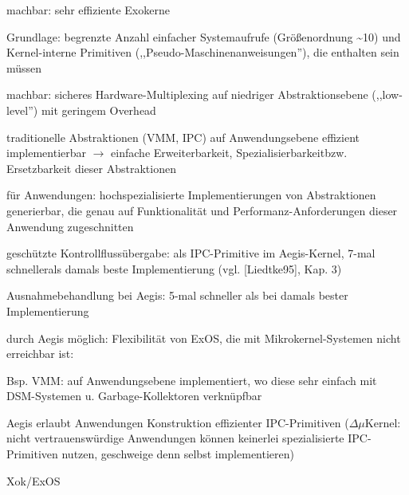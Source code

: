 \documentclass[a4paper]{article}
\begin{document}
\begin{multicols}{3}
    \begin{enumerate*}
        \item
        machbar: sehr effiziente Exokerne
        \begin{itemize*}
            \item Grundlage: begrenzte Anzahl einfacher Systemaufrufe (Größenordnung \textasciitilde10) und Kernel-interne Primitiven (,,Pseudo-Maschinenanweisungen''), die enthalten sein müssen
        \end{itemize*}
        \item
        machbar: sicheres Hardware-Multiplexing auf niedriger
        Abstraktionsebene (,,low-level'') mit geringem Overhead
        \item
        traditionelle Abstraktionen (VMM, IPC) auf Anwendungsebene effizient
        implementierbar $\rightarrow$  einfache
        Erweiterbarkeit, Spezialisierbarkeitbzw. Ersetzbarkeit dieser
        Abstraktionen
        \item
        für Anwendungen: hochspezialisierte Implementierungen von
        Abstraktionen generierbar, die genau auf Funktionalität und
        Performanz-Anforderungen dieser Anwendung zugeschnitten
        \item
        geschützte Kontrollflussübergabe: als IPC-Primitive im Aegis-Kernel,
        7-mal schnellerals damals beste Implementierung (vgl. {[}Liedtke95{]},
        Kap. 3)
        \item
        Ausnahmebehandlung bei Aegis: 5-mal schneller als bei damals bester
        Implementierung
        \item
        durch Aegis möglich: Flexibilität von ExOS, die mit
        Mikrokernel-Systemen nicht erreichbar ist:
        \begin{itemize*}
            \item Bsp. VMM: auf Anwendungsebene implementiert, wo diese sehr einfach mit DSM-Systemen u. Garbage-Kollektoren verknüpfbar
        \end{itemize*}
        \item
        Aegis erlaubt Anwendungen Konstruktion effizienter IPC-Primitiven ($\Delta \mu$Kernel: nicht vertrauenswürdige Anwendungen können keinerlei spezialisierte IPC-Primitiven nutzen, geschweige denn selbst implementieren)
    \end{enumerate*}

    Xok/ExOS


\end{multicols}
\end{document}
